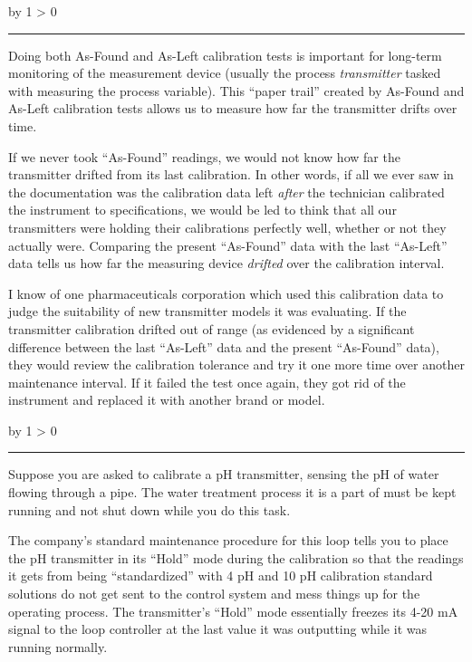 \documentclass[12pt,a4paper]{article}
\def\oppgave{
            \advance\questnum by 1
            \ifnum \questnum > 0
                 \hrule
                 \vskip 3pt
                 \leftline{Oppgave \the\questnum}
                 \vskip 3pt \fi}
\def\notes{
           \advance\explnum by 1
           \ifnum \explnum > 0
                \hrule
                \vskip 3pt
                \leftline{Notes \the\explnum}
                \vskip 3pt \fi}
\begin{document}
\notes{} 

Doing both As-Found and As-Left calibration tests is important for long-term monitoring of the measurement device (usually the process {\it transmitter} tasked with measuring the process variable).  This ``paper trail'' created by As-Found and As-Left calibration tests allows us to measure how far the transmitter drifts over time.

If we never took ``As-Found'' readings, we would not know how far the transmitter drifted from its last calibration.  In other words, if all we ever saw in the documentation was the calibration data left {\it after} the technician calibrated the instrument to specifications, we would be led to think that all our transmitters were holding their calibrations perfectly well, whether or not they actually were.  Comparing the present ``As-Found'' data with the last ``As-Left'' data tells us how far the measuring device {\it drifted} over the calibration interval.

I know of one pharmaceuticals corporation which used this calibration data to judge the suitability of new transmitter models it was evaluating.  If the transmitter calibration drifted out of range (as evidenced by a significant difference between the last ``As-Left'' data and the present ``As-Found'' data), they would review the calibration tolerance and try it one more time over another maintenance interval.  If it failed the test once again, they got rid of the instrument and replaced it with another brand or model.


\vfil \eject 



\oppgave{} 

Suppose you are asked to calibrate a pH transmitter, sensing the pH of water flowing through a pipe.  The water treatment process it is a part of must be kept running and not shut down while you do this task.  

The company's standard maintenance procedure for this loop tells you to place the pH transmitter in its ``Hold'' mode during the calibration so that the readings it gets from being ``standardized'' with 4 pH and 10 pH calibration standard solutions do not get sent to the control system and mess things up for the operating process.  The transmitter's ``Hold'' mode essentially freezes its 4-20 mA signal to the loop controller at the last value it was outputting while it was running normally.
\end{document}
